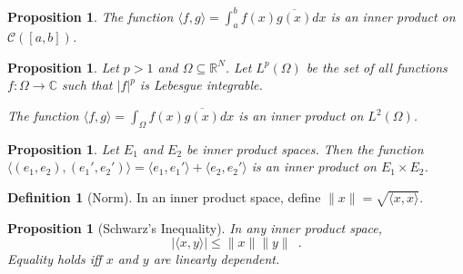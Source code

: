 \documentclass{book}
\newtheorem{prop}[ax]{Proposition}
\theoremstyle{definition}
\newtheorem{df}[ax]{Definition}
\begin{document}
\begin{prop}
The function $\langle f, g \rangle = \int_a^b f(x) \overline{g(x)} dx$ is an inner product on $\mathcal{C}([a,b])$.
\end{prop}

\begin{prop}
Let $p > 1$ and $\Omega \subseteq \mathbb{R}^N$. Let $L^p(\Omega)$ be the set of all functions $f : \Omega \rightarrow \mathbb{C}$ such that $|f|^p$ is Lebesgue integrable.

The function $\langle f,g \rangle = \int_\Omega f(x) \overline{g(x)} dx$ is an inner product on $L^2(\Omega)$.
\end{prop}

\begin{prop}
Let $E_1$ and $E_2$ be inner product spaces. Then the function $\langle (e_1,e_2),(e_1',e_2') \rangle = \langle e_1, e_1' \rangle + \langle e_2, e_2' \rangle$ is an inner product on $E_1 \times E_2$.
\end{prop}

\begin{df}[Norm]
In an inner product space, define $\|x\| = \sqrt{\langle x,x \rangle}$.
\end{df}

\begin{prop}[Schwarz's Inequality]
In any inner product space,
\[ |\langle x,y \rangle| \leq \| x \| \| y \| \enspace . \]
Equality holds iff $x$ and $y$ are linearly dependent.
\end{prop}
\end{document}
